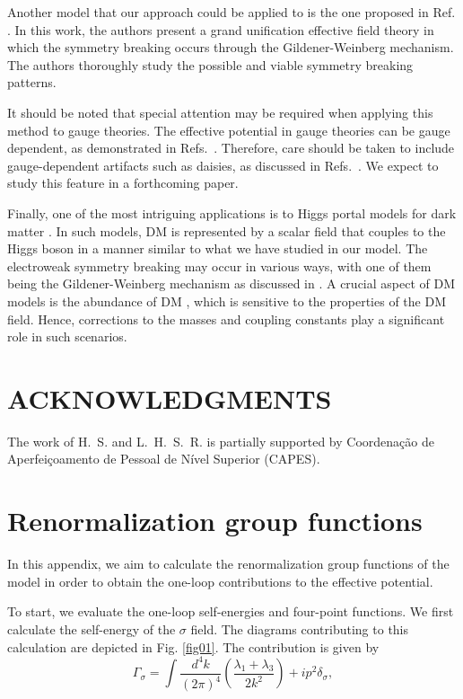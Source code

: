 \documentclass[11pt,a4paper,english,superscriptaddress,preprint,aps,prd]{revtex4}
\begin{document}
Another model that our approach could be applied to is the one proposed in Ref. \cite{Held:2022hnw}. In this work, the authors present a grand unification effective field theory in which the symmetry breaking occurs through the Gildener-Weinberg mechanism. The authors thoroughly study the possible and viable symmetry breaking patterns.

It should be noted that special attention may be required when applying this method to gauge theories. The effective potential in gauge theories can be gauge dependent, as demonstrated in Refs.~\cite{Jackiw:1974cv,Nielsen:1975fs}. Therefore, care should be taken to include gauge-dependent artifacts such as daisies, as discussed in Refs.~\cite{Bazeia:1988pz,deLima:1989yf,Andreassen:2014eha}. We expect to study this feature in a forthcoming paper.

Finally, one of the most intriguing applications is to Higgs portal models for dark matter \cite{Cosme:2018nly, Arcadi:2019lka, Arcadi:2021mag, Steele:2013fka}. In such models, DM is represented by a scalar field that couples to the Higgs boson in a manner similar to what we have studied in our model. The electroweak symmetry breaking may occur in various ways, with one of them being the Gildener-Weinberg mechanism as discussed in \cite{Steele:2013fka}. A crucial aspect of DM models is the abundance of DM \cite{Gondolo:1990dk}, which is sensitive to the properties of the DM field. Hence, corrections to the masses and coupling constants play a significant role in such scenarios.

\section*{ACKNOWLEDGMENTS}
The work of H.~S. and L.~H.~S.~R. is partially supported
by Coordena\c{c}\~ao de Aperfei\c{c}oamento de Pessoal de N\'ivel Superior (CAPES).

\appendix
\section{Renormalization group functions}\label{apxA}

In this appendix, we aim to calculate the renormalization group functions of the model in order to obtain the one-loop contributions to the effective potential.

To start, we evaluate the one-loop self-energies and four-point functions. We first calculate the self-energy of the $\sigma$ field. The diagrams contributing to this calculation are depicted in Fig. \ref{fig01}. The contribution is given by
\begin{equation}
\Gamma_\sigma = \int\frac{d^4k}{(2\pi)^4}\left(\frac{\lambda_1+\lambda_3}{2k^2}\right) + ip^2\delta_\sigma,
\end{equation}
\end{document}
